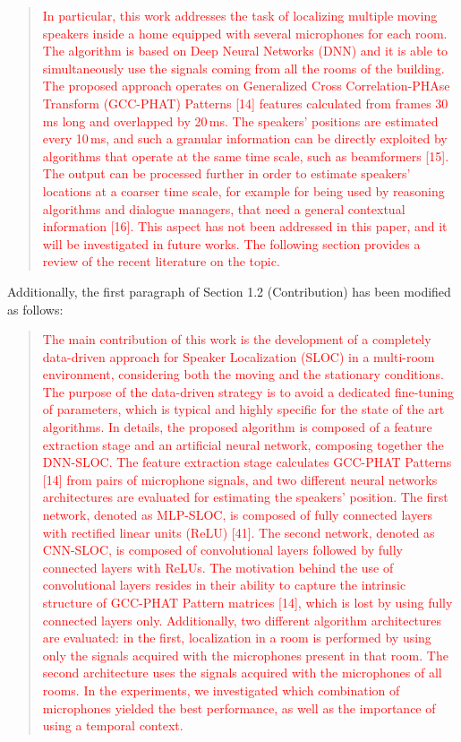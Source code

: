\documentclass[11pt, technote, letterpaper, oneside, onecolumn]{IEEEtran}
\begin{document}
\begin{enumerate}
\begin{quote}
\textcolor{red}{
In particular, this work addresses the task of localizing multiple moving speakers inside a home equipped with several microphones for each room. The algorithm is based on Deep Neural Networks (DNN) and it is able to simultaneously use the signals coming from all the rooms of the building. The proposed approach operates on Generalized Cross Correlation-PHAse Transform (GCC-PHAT) Patterns [14] features calculated from frames 30\,ms long and overlapped by 20\,ms. The speakers' positions are estimated every 10\,ms, and such a granular information can be directly exploited by algorithms that operate at the same time scale, such as beamformers [15]. The output can be processed further in order to estimate speakers' locations at a coarser time scale, for example for being used by reasoning algorithms and dialogue managers, that need a general contextual information [16]. This aspect has not been addressed in this paper, and it will be investigated in future works. The following section provides a review of the recent literature on the topic.
}
\end{quote}

Additionally, the first paragraph of Section 1.2 (Contribution) has been modified as follows:
	\begin{quote}
		\textcolor{red}{
		The main contribution of this work is the development of a completely data-driven approach for Speaker Localization (SLOC) in a multi-room environment, considering both the moving and the stationary conditions. 		The purpose of the data-driven strategy is to avoid a dedicated fine-tuning of parameters, which is typical and highly specific for the state of the art algorithms.
		In details, the proposed algorithm is composed of a feature extraction stage and an artificial neural network, composing together the DNN-SLOC. The feature extraction stage calculates GCC-PHAT Patterns [14] from pairs of microphone signals, and two different neural networks architectures are evaluated for estimating the speakers' position. The first network, denoted as MLP-SLOC, is composed of fully connected layers with rectified linear units (ReLU) [41]. The second network, denoted as CNN-SLOC, is composed of convolutional layers followed by fully connected layers with ReLUs. The motivation behind the use of convolutional layers resides in their ability to capture the intrinsic structure of GCC-PHAT Pattern matrices [14], which is lost by using fully connected layers only. Additionally, two different algorithm architectures are evaluated: in the first, localization in a room is performed by using only the signals acquired with the microphones present in that room. The second architecture uses the signals acquired with the microphones of all rooms. In the experiments, we investigated which combination of microphones yielded the best performance, as well as the importance of using a temporal context.
		}
	\end{quote}


\end{enumerate}
\end{document}
